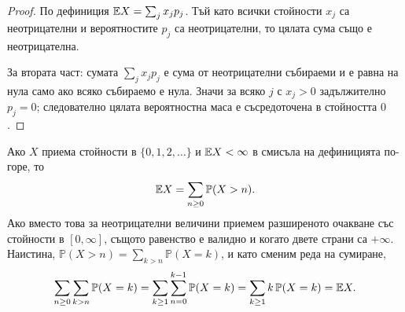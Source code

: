 \begin{proof}
По дефиниция $\mathbb{E} X = \sum_{j} x_j p_j$. Тъй като всички стойности $x_j$ са неотрицателни и вероятностите $p_j$ са неотрицателни, то цялата сума също е неотрицателна.

За втората част: сумата $\sum_j x_j p_j$ е сума от неотрицателни събираеми и е равна на нула
само ако всяко събираемо е нула. Значи за всяко $j$ с $x_j > 0$ задължително $p_j = 0$;
следователно цялата вероятностна маса е съсредоточена в стойността $0$.
\end{proof}

\begin{supp}\label{supp:tail-sum}
Ако $X$ приема стойности в $\{0, 1, 2, \dots\}$ и $\mathbb{E} X<\infty$ в смисъла на
дефиницията по-горе, то
\[ \mathbb{E} X = \sum_{n \ge 0} \mathbb{P}(X > n) . \]
Ако вместо това за неотрицателни величини приемем разширеното очакване със стойности
в $[0,\infty]$, същото равенство е валидно и когато двете страни са $+\infty$.
Наистина, $\mathbb{P}(X > n) = \sum_{k > n} \mathbb{P}(X = k)$, и като сменим реда на
сумиране,
\[
\sum_{n \ge 0} \sum_{k > n} \mathbb{P}(X = k)
 = \sum_{k \ge 1} \sum_{n=0}^{k-1} \mathbb{P}(X = k)
 = \sum_{k \ge 1} k\, \mathbb{P}(X = k) = \mathbb{E} X .
\]


\end{supp}
